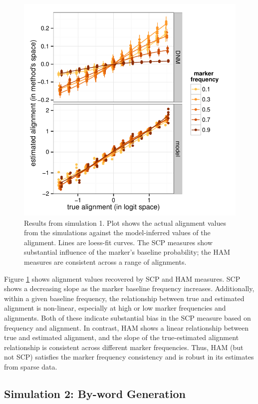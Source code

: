 \documentclass{acm_proc_article-sp}
\begin{document}
\begin{figure}[t]
\centering
\includegraphics[width=\columnwidth]{graphics/www2016_simulation1_crossiter.pdf}
\caption{Results from simulation 1. Plot shows the actual alignment values from the simulations against the model-inferred values of the alignment. Lines are loess-fit curves. The SCP measures show substantial influence of the marker's baseline probability; the HAM measures are consistent across a range of alignments.}\label{fig:sim1}
\end{figure}

Figure \ref{fig:sim1} shows alignment values recovered by SCP and HAM measures. SCP shows a decreasing slope as the marker baseline frequency increases.  Additionally, within a given baseline frequency, the relationship between true and estimated alignment is non-linear, especially at high or low marker frequencies and alignments. Both of these indicate substantial bias in the SCP measure based on frequency and alignment. In contrast, HAM shows a linear relationship between true and estimated alignment, and the slope of the true-estimated alignment relationship is consistent across different marker frequencies.  Thus, HAM (but not SCP) satisfies the marker frequency consistency and is robust in its estimates from sparse data.

\subsection{Simulation 2: By-word Generation}
\end{document}
